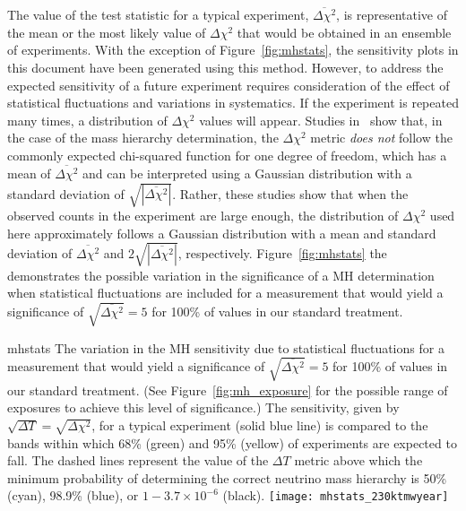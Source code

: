 The value of the test statistic for a typical experiment,  
$\overline{\Delta\chi^2}$, is
representative of the mean or the most likely value of $\Delta\chi^2$ that 
would be obtained in an ensemble of experiments.
With the exception of Figure~\ref{fig:mhstats}, the sensitivity plots
in this document have been generated using this method.
However, to address the expected sensitivity of a future experiment
requires consideration of the effect of
statistical fluctuations and variations in systematics.  If the
experiment is repeated many times, a distribution of $\Delta\chi^2$
values will appear.  Studies in~\cite{Qian:2012zn,Blennow:2013oma}
show that, in the case of the mass hierarchy
determination, the $\Delta \chi^2$ metric
{\em does not} follow the commonly expected chi-squared
function for one degree of freedom, which has a mean of
$\overline{\Delta\chi^2}$ and can be interpreted using a Gaussian
distribution with a standard deviation of
$\sqrt{|\overline{\Delta\chi^2}|}$. Rather, these studies show that
when the observed counts in the experiment are large enough,
the distribution of $\Delta\chi^2$ used here approximately follows
a Gaussian distribution with a
mean and standard deviation of $\overline{\Delta\chi^2}$ and
$2\sqrt{|\overline{\Delta\chi^2}|}$, respectively. Figure~\ref{fig:mhstats} the
demonstrates the possible variation in the significance of a MH determination when statistical
fluctuations are included for a measurement that would yield a significance of $\sqrt{\overline{\Delta\chi^{2}}} = 5$ for 100\% of \deltacp values in our standard treatment.

\begin{cdrfigure}{mhstats}{
  The variation in the MH sensitivity due to statistical fluctuations for a measurement that would yield a significance of $\sqrt{\overline{\Delta\chi^{2}}} = 5$ for 100\% of \deltacp values in our standard treatment. (See Figure~\ref{fig:mh_exposure} for the possible range of exposures to achieve this level of significance.)  The 
  sensitivity, given by  $\sqrt{\Delta T}=\sqrt{\Delta\chi^2}$, for a typical experiment 
  (solid blue line) is compared to the bands within which
  68\% (green) and 95\% (yellow) of experiments are expected to fall. The dashed lines
  represent the value of the $\Delta T$ metric above which the minimum
  probability of determining
  the correct neutrino mass hierarchy is 50\%(cyan), 98.9\% (blue), or $1 - 3.7\times10^{-6}$
  (black). }
 \texttt{[image: mhstats\_230ktmwyear]}
\end{cdrfigure}

